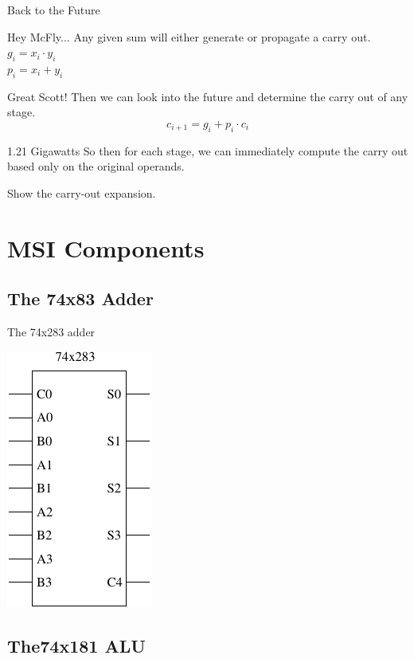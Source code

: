 \begin{frame}{Back to the Future}
  \begin{block}{Hey McFly...}
    Any given sum will either generate or propagate a carry out.\\
    $g_i = x_i \cdot y_i$\\
    $p_i = x_i + y_i$
  \end{block}
  \begin{block}{Great Scott!}
    Then we can look into the future and determine the carry out of any stage.
    $$c_{i+1} = g_i + p_i \cdot c_i$$
  \end{block}
  \begin{block}{1.21 Gigawatts}
    So then for each stage, we can \alert{immediately} compute the carry out based only on the original operands.
  \end{block}
\end{frame}

Show the carry-out expansion.

\section{MSI Components}
\subsection{The 74x83 Adder}

\begin{frame}{The 74x283 adder}
  \begin{center}
    \includegraphics{74x283Schematic}
  \end{center}
\end{frame}

\subsection{The74x181 ALU}

